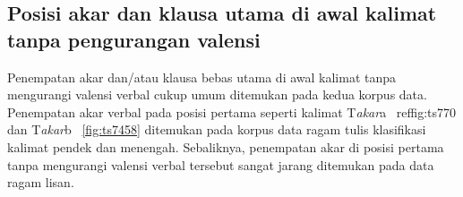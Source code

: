 \subsection{Posisi akar dan klausa utama di awal kalimat tanpa pengurangan valensi}
Penempatan akar dan/atau klausa bebas utama di awal kalimat tanpa mengurangi valensi verbal cukup umum ditemukan pada kedua korpus data. Penempatan akar verbal pada posisi pertama seperti kalimat T\textit{akar}a \pic~ref{fig:ts770} dan T\textit{akar}b \pic~\ref{fig:ts7458} ditemukan pada korpus data ragam tulis klasifikasi kalimat pendek dan menengah. Sebaliknya, penempatan akar di posisi pertama tanpa mengurangi valensi verbal tersebut sangat jarang ditemukan pada data ragam lisan.

\begin{figure}
\centering


\end{figure}
